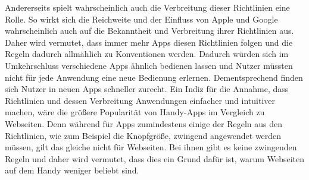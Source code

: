 		Andererseits spielt wahrscheinlich auch die Verbreitung dieser Richtlinien eine Rolle. So wirkt sich die Reichweite und der Einfluss von Apple und Google wahrscheinlich auch auf die Bekanntheit und Verbreitung ihrer Richtlinien aus. %
		Daher wird vermutet, dass immer mehr Apps diesen Richtlinien folgen und die Regeln dadurch allmählich zu Konventionen werden. %
		Dadurch würden sich im Umkehrschluss verschiedene Apps ähnlich bedienen lassen und Nutzer müssten nicht für jede Anwendung eine neue Bedienung erlernen. Dementsprechend finden sich Nutzer in neuen Apps schneller zurecht.\newline%
		Ein Indiz für die Annahme, dass Richtlinien und dessen Verbreitung Anwendungen einfacher und intuitiver machen, wäre die größere Popularität von Handy-Apps im Vergleich zu Webseiten\cite{pcVsphone_mobileAppVsWebTimeSpent}. 
		Denn während für Apps zumindestens einige der Regeln aus den Richtlinien, wie zum Beispiel die Knopfgröße, zwingend angewendet werden müssen\cite{konventionen_buttonSize}, gilt das gleiche nicht für Webseiten. Bei ihnen gibt es keine zwingenden Regeln und daher wird vermutet, dass dies ein Grund dafür ist, warum Webseiten auf dem Handy weniger beliebt sind.















